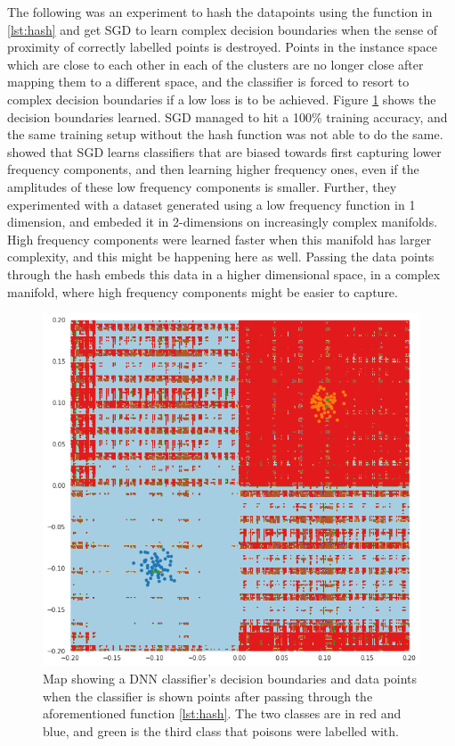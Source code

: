 \documentclass{ociamthesis}
\begin{document}
The following was an experiment to hash the datapoints using the function in
\cref{lst:hash} and get SGD to learn complex decision boundaries when the sense
of proximity of correctly labelled points is destroyed. Points in the instance
space which are close to each other in each of the clusters are no longer close
after mapping them to a different space, and the classifier is forced to resort
to complex decision boundaries if a low loss is to be achieved. Figure
\ref{fig:hash-trick} shows the decision boundaries learned. SGD managed to hit a
100\% training accuracy, and the same training setup without the hash function
was not able to do the same.
\citet{rahaman2019spectral} showed that SGD learns classifiers that are biased
towards first capturing lower frequency components, and then learning higher
frequency ones, even if the amplitudes of these low frequency components is
smaller. Further, they experimented with a dataset generated using a low
frequency function in 1 dimension, and embeded it in 2-dimensions on
increasingly complex manifolds. High frequency components were learned faster
when this manifold has larger complexity, and this might be happening here as
well. Passing the data points through the hash embeds this data in a higher
dimensional space, in a complex manifold, where high frequency components might
be easier to capture.
\begin{figure}[!htb]
    \centering
    \includegraphics[scale=0.6]{hash_trick}
    \caption{Map showing a DNN classifier's decision boundaries and data points
    when the classifier is shown points after passing through the aforementioned
    function \ref{lst:hash}. The two classes are in red and blue, and green is
    the third class that poisons were labelled with.}
    \label{fig:hash-trick}
\end{figure}
\end{document}
